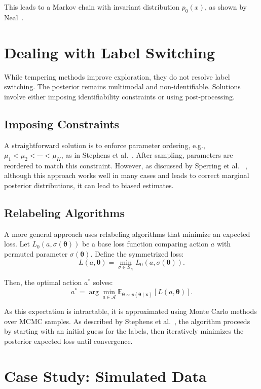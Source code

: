 \documentclass[11pt]{article}
\newcommand{\bx}{\boldsymbol{x}}
\newcommand{\btheta}{\boldsymbol{\theta}}
\begin{document}
This leads to a Markov chain with invariant distribution $p_0(x)$, as shown by Neal~\citep{neal1996sampling}.

\section{Dealing with Label Switching}

While tempering methods improve exploration, they do not resolve label switching. The posterior 
remains multimodal and non-identifiable. Solutions involve either imposing identifiability 
constraints or using post-processing.

\subsection{Imposing Constraints}

A straightforward solution is to enforce parameter ordering, e.g., 
$\mu_1 < \mu_2 < \cdots < \mu_K$, as in Stephens et al.~\citep{stephens1997bayesian}. After 
sampling, parameters are reordered to match this constraint. However, as discussed by Sperring et al.~
\citep{sperrin2010probabilistic}, although this approach works well in many cases and leads to correct
marginal posterior distributions, it can lead to biased estimates.

\subsection{Relabeling Algorithms}

A more general approach uses relabeling algorithms that minimize an expected loss. Let 
$L_0(a, \sigma(\btheta))$ be a base loss function comparing action $a$ with permuted parameter 
$\sigma(\btheta)$. Define the symmetrized loss:
\[
    L(a, \btheta) = \min_{\sigma \in S_K} L_0(a, \sigma(\btheta)).
\]

Then, the optimal action $a^*$ solves:
\[
    a^* = \arg\min_{a \in \mathcal{A}} \mathbb{E}_{\btheta \sim p(\btheta \mid \bx)}[L(a, \btheta)].
\]

As this expectation is intractable, it is approximated using Monte Carlo methods over MCMC samples. As 
described by Stephens et al.~\citep{stephens2002dealing}, the algorithm proceeds by starting with an
initial guess for the labels, then iteratively minimizes the posterior expected loss until convergence.

\section{Case Study: Simulated Data}
\end{document}
